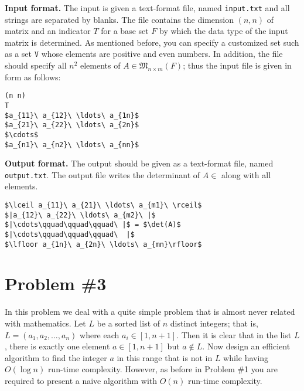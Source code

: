 \documentclass{article}
\newcommand{\M}[2]{{\mathfrak{M}_{#1\times #2}}}
\begin{document}
\bigskip
\noindent\textbf{Input format.} %
The input is given a text-format file, named \texttt{input.txt} and all strings are separated by blanks.
The file contains the dimension $(n,n)$ of matrix and an indicator $T$ for a base set $F$ by which 
the data type of the input matrix is determined. 
As mentioned before, you can specify a customized set such as a set $\mathtt{V}$
whose elements are positive and even numbers.
In addition, the file should specify all $n^2$ elements of $A\in\M{n}{m}(F)$; thus the input file is given in form as follows:
\begin{lstlisting}[backgroundcolor=\color{yellow!40}]
(n n)
T
$a_{11}\ a_{12}\ \ldots\ a_{1n}$
$a_{21}\ a_{22}\ \ldots\ a_{2n}$
$\cdots$
$a_{n1}\ a_{n2}\ \ldots\ a_{nn}$
\end{lstlisting}



\bigskip
\noindent\textbf{Output format.} %
The output should be given as a text-format file, named \texttt{output.txt}.
The output file writes the determinant of $A\in$ along with all elements.


\begin{lstlisting}[backgroundcolor=\color{yellow!40}]
$\lceil a_{11}\ a_{21}\ \ldots\ a_{m1}\ \rceil$
$|a_{12}\ a_{22}\ \ldots\ a_{m2}\ |$
$|\cdots\qquad\qquad\qquad\ |$ = $\det(A)$
$|\cdots\qquad\qquad\qquad\  |$ 
$\lfloor a_{1n}\ a_{2n}\ \ldots\ a_{mn}\rfloor$

\end{lstlisting}


% 
\newpage
\section*{Problem \#3} 

In this problem we deal with a quite  simple problem that is almost never related with mathematics.
Let $L$ be a sorted list of $n$ distinct integers; that is, $L=(a_1,a_2,\ldots,a_n)$ where 
each $a_i\in[1,n+1]$. Then it is clear that in the list $L$, there is exactly one element $a\in[1,n+1]$ but 
$a\not\in L$. Now design an efficient algorithm to 
find the integer $a$ in this range that is not in $L$ while having $O(\log n)$ run-time complexity.
However, as before in Problem \#1 you are required to present a naive algorithm with $O(n)$ 
run-time complexity.
\end{document}
